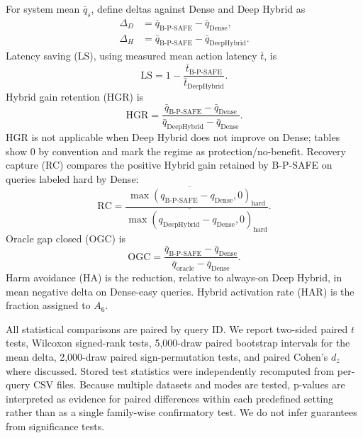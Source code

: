 \documentclass[10pt,journal]{IEEEtran}
\newcommand{\bpsafe}{B-P-SAFE}
\newcommand{\deephybrid}{Deep Hybrid}
\begin{document}
For system mean $\bar q_s$, define deltas against Dense and \deephybrid{} as
\begin{equation}
\begin{aligned}
\Delta_D&=\bar q_{\mathrm{B\text{-}P\text{-}SAFE}}-\bar q_{\mathrm{Dense}},\\
\Delta_H&=\bar q_{\mathrm{B\text{-}P\text{-}SAFE}}-\bar q_{\mathrm{DeepHybrid}}.
\end{aligned}
\label{eq:deltas}
\end{equation}
Latency saving (LS), using measured mean action latency $\bar t$, is
\begin{equation}
\mathrm{LS}=1-\frac{\bar t_{\mathrm{B\text{-}P\text{-}SAFE}}}
{\bar t_{\mathrm{DeepHybrid}}}.
\label{eq:ls}
\end{equation}
Hybrid gain retention (HGR) is
\begin{equation}
\mathrm{HGR}=
\frac{
\bar{q}_{\mathrm{B\text{-}P\text{-}SAFE}}-\bar{q}_{\mathrm{Dense}}
}{
\bar{q}_{\mathrm{DeepHybrid}}-\bar{q}_{\mathrm{Dense}}
}.
\label{eq:hgr}
\end{equation}
HGR is not applicable when \deephybrid{} does not improve on Dense; tables show 0 by convention and mark the regime as protection/no-benefit. Recovery capture (RC) compares the positive Hybrid gain retained by \bpsafe{} on queries labeled hard by Dense:
\begin{equation}
\mathrm{RC}=
\frac{\overline{\max(q_{\mathrm{B\text{-}P\text{-}SAFE}}-q_{\mathrm{Dense}},0)}_{\mathrm{hard}}}
{\overline{\max(q_{\mathrm{DeepHybrid}}-q_{\mathrm{Dense}},0)}_{\mathrm{hard}}}.
\label{eq:rc}
\end{equation}
Oracle gap closed (OGC) is
\begin{equation}
\mathrm{OGC}=
\frac{
\bar{q}_{\mathrm{B\text{-}P\text{-}SAFE}}-\bar{q}_{\mathrm{Dense}}
}{
\bar{q}_{\mathrm{oracle}}-\bar{q}_{\mathrm{Dense}}
}.
\label{eq:ogc}
\end{equation}
Harm avoidance (HA) is the reduction, relative to always-on \deephybrid{}, in mean negative delta on Dense-easy queries. Hybrid activation rate (HAR) is the fraction assigned to $A_6$.

All statistical comparisons are paired by query ID. We report two-sided paired $t$ tests, Wilcoxon signed-rank tests, 5,000-draw paired bootstrap intervals for the mean delta, 2,000-draw paired sign-permutation tests, and paired Cohen's $d_z$ where discussed. Stored test statistics were independently recomputed from per-query CSV files. Because multiple datasets and modes are tested, p-values are interpreted as evidence for paired differences within each predefined setting rather than as a single family-wise confirmatory test. We do not infer guarantees from significance tests.
\end{document}
